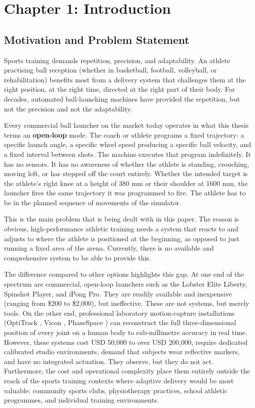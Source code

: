 \chapter{Chapter 1: Introduction}

\section{Motivation and Problem Statement}

Sports training demands repetition, precision, and adaptability. An athlete practising ball reception (whether in basketball, football, volleyball, or rehabilitation) benefits most from a delivery system that challenges them at the right position, at the right time, directed at the right part of their body. For decades, automated ball-launching machines have provided the repetition, but not the precision and not the adaptability.

Every commercial ball launcher on the market today operates in what this thesis terms an \textbf{open-loop} mode. The coach or athlete programs a fixed trajectory: a specific launch angle, a specific wheel speed producing a specific ball velocity, and a fixed interval between shots. The machine executes that program indefinitely. It has no sensors. It has no awareness of whether the athlete is standing, crouching, moving left, or has stepped off the court entirely. Whether the intended target is the athlete's right knee at a height of 380 mm or their shoulder at 1600 mm, the launcher fires the same trajectory it was programmed to fire. The athlete has to be in the planned sequence of movements of the simulator.

This is the main problem that is being dealt with in this paper. The reason is obvious, high-performance athletic training needs a system that reacts to and adjusts to where the athlete is positioned at the beginning, as opposed to just running a fixed area of the arena. Currently, there is no available and comprehensive system to be able to provide this.

The difference compared to other options highlights this gap. At one end of the spectrum are commercial, open-loop launchers such as the Lobster Elite Liberty, Spinshot Player, and iPong Pro. They are readily available and inexpensive (ranging from \$200 to \$2,000), but ineffective. These are not systems, but merely tools. On the other end, professional laboratory motion-capture installations (OptiTrack \cite{ref30}, Vicon \cite{ref8}, PhaseSpace \cite{ref31}) can reconstruct the full three-dimensional position of every joint on a human body to sub-millimetre accuracy in real time. However, these systems cost USD 50,000 to over USD 200,000, require dedicated calibrated studio environments, demand that subjects wear reflective markers, and have no integrated actuation. They observe, but they do not act. Furthermore, the cost and operational complexity place them entirely outside the reach of the sports training contexts where adaptive delivery would be most valuable: community sports clubs, physiotherapy practices, school athletic programmes, and individual training environments.

